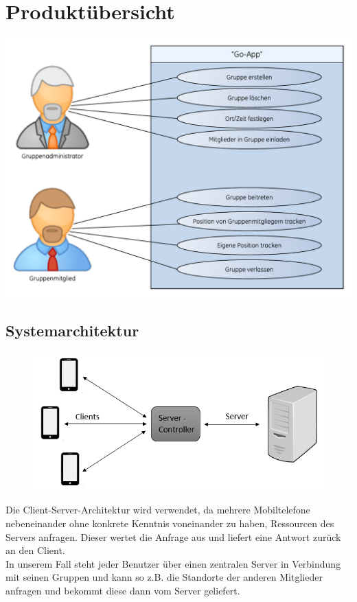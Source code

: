 \section{Produktübersicht}
\includegraphics[scale=0.8, trim=2cm 0 0 0cm]{res/anwendungsfall.pdf}

\subsection{Systemarchitektur}

\begin{figure} [h]
	\centering
	\includegraphics[scale = 0.8]{res/clientServerArchitektur.png}
\end{figure}
Die Client-Server-Architektur wird verwendet, da mehrere Mobiltelefone nebeneinander ohne konkrete Kenntnis voneinander zu haben, Ressourcen des Servers anfragen. Dieser wertet die Anfrage aus und liefert eine Antwort zurück an den Client. \\
In unserem Fall steht jeder Benutzer über einen zentralen Server in Verbindung mit seinen Gruppen und kann so z.B. die Standorte der anderen Mitglieder anfragen und bekommt diese dann vom Server geliefert.

